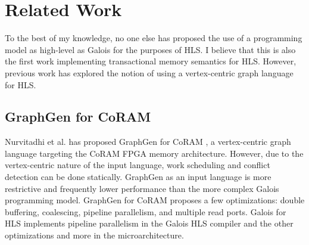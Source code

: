 %
\section{Related Work}\label{sect:relatedWork}
To the best of my knowledge, no one else has proposed the use of a programming model as high-level as Galois for the 
purposes of HLS. I believe that this is also the first work implementing transactional memory semantics for HLS. 
However, previous work has explored the notion of using a vertex-centric graph language for HLS. 

\subsection{GraphGen for CoRAM}

Nurvitadhi et al. has proposed GraphGen for CoRAM \cite{graphGenCoRAM}, a vertex-centric graph language targeting the 
CoRAM \cite{coram} FPGA memory architecture. However, due to the vertex-centric nature of the input language, work 
scheduling and conflict detection can be done statically. GraphGen as an input language is more restrictive and 
frequently lower performance than the more complex Galois programming model. GraphGen for CoRAM proposes a few 
optimizations: double buffering, coalescing, pipeline parallelism, and multiple read ports. Galois for HLS implements 
pipeline parallelism in the Galois HLS compiler and the other optimizations and more in the microarchitecture.
